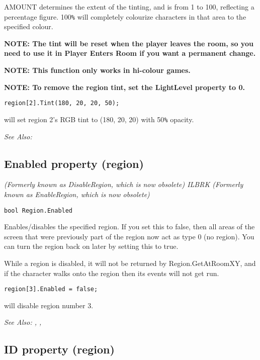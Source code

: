 AMOUNT determines the extent of the tinting, and is from 1 to 100, reflecting a percentage
figure. 100\verb$%$ will completely colourize characters in that area to the specified colour.

\bf{NOTE}: The tint will be reset when the player leaves the room,
so you need to use it in Player Enters Room if you want a permanent
change.

\bf{NOTE:} This function only works in hi-colour games.

\bf{NOTE}: To remove the region tint, set the LightLevel property to 0.

\begin{verbatim}
region[2].Tint(180, 20, 20, 50);
\end{verbatim}
will set region 2's RGB tint to (180, 20, 20) with 50\verb$%$ opacity.

\it{See Also:} 



\subsection{Enabled property (region)}\label{Region.Enabled}%

\it{(Formerly known as DisableRegion, which is now obsolete)} ILBRK
\it{(Formerly known as EnableRegion, which is now obsolete)}

\begin{verbatim}
bool Region.Enabled
\end{verbatim}
Enables/disables the specified region. If you set this to false, then all areas of the screen
that were previously part of the region now act as type 0 (no region). You can turn the region
back on later by setting this to true.

While a region is disabled, it will not be returned by Region.GetAtRoomXY, and if
the character walks onto the region then its events will not get run.

\begin{verbatim}
region[3].Enabled = false;
\end{verbatim}
will disable region number 3.

\it{See Also:} ,
,


\subsection{ID property (region)}\label{Region.ID}%

